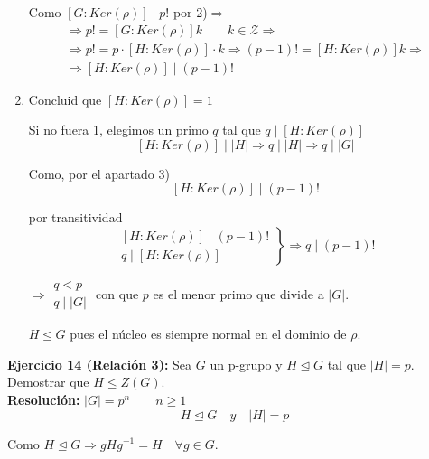 \documentclass{article}
\begin{document}
\begin{enumerate}[1)]
Como $\left[G:Ker(\rho)\right]\mid p!$ por 2)$\Rightarrow$
\begin{gather*}
\Rightarrow p!=\left[G:Ker(\rho)\right]k\qquad k\in \mathcal{Z} \Rightarrow \\
\Rightarrow p!=p\cdot \left[H:Ker(\rho)\right]\cdot k\Rightarrow (p-1)!=\left[H:Ker(\rho)\right]k\Rightarrow \\
\Rightarrow \left[H:Ker(\rho)\right] \mid (p-1)!
\end{gather*}

\item Concluid que $\left[H:Ker(\rho)\right]=1$

Si no fuera 1, elegimos un primo $q$ tal que $q\mid \left[H:Ker(\rho)\right]$
\begin{equation*}
\left[H:Ker(\rho)\right] \mid |H|\Rightarrow q\mid |H| \Rightarrow q\mid |G|
\end{equation*}

Como, por el apartado 3)
\begin{equation*}
\left[H:Ker(\rho)\right]\mid (p-1)!
\end{equation*}

por transitividad
\begin{equation*}
\left.\begin{array}{c}
\left[H:Ker(\rho)\right]\mid (p-1)!\\
q\mid \left[H:Ker(\rho)\right]
\end{array} \right\rbrace \Rightarrow q\mid (p-1)!
\end{equation*}

$\Rightarrow \left.\begin{array}{c}
q<p\\
q\mid |G|
\end{array}\right.$ con que $p$ es el menor primo que divide a $|G|$.

$H\unlhd G$ pues el núcleo es siempre normal en el dominio de $\rho$. 

\end{enumerate}

\textbf{Ejercicio 14 (Relación 3):} Sea $G$ un p-grupo y $H\unlhd G$ tal que $|H|=p$. Demostrar que $H\leq Z(G)$. \\

\textbf{Resolución:} $|G|=p^n\qquad n\geq 1$
\begin{equation*}
H\unlhd G\quad y\quad |H|=p
\end{equation*}

Como $H\unlhd G\Rightarrow gHg^{-1}=H\quad \forall g\in G$.
\end{document}
